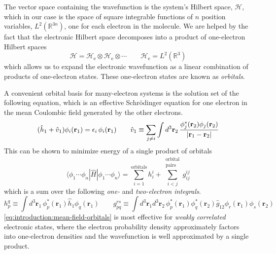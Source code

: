 The vector space containing the wavefunction is the system's Hilbert space,
\(\mathcal{H}\), which in our case is the space of square integrable functions
of \(n\) position variables,
\(
    L^2(\mathbb{R}^{3n})
\),
one for each electron in the molecule.
We are helped by the fact that the electronic Hilbert space decomposes into a
product of one-electron Hilbert spaces
\begin{equation}
    \mathcal{H}
    =
    \mathcal{H}_\mathrm{e}
    \otimes
    \mathcal{H}_\mathrm{e}
    \otimes
    \cdots
    \qquad
    \mathcal{H}_\mathrm{e}
    =
    L^2(\mathbb{R}^3)
\end{equation}
which allows us to expand the electronic wavefunction as a linear combination of
products of one-electron states.
These one-electron states are known as {\itshape orbitals}.

A convenient orbital basis for many-electron systems is the solution set of the
following equation, which is an effective Schr\"odinger equation for one
electron in the mean Coulombic field generated by the other electrons.
\begin{equation}
    \label{eq:introduction:mean-field-orbitals}
    (
        \hat{h}_1
        +
        \hat{v}_1
    )
    \phi_i(\mathbf{r}_1)
    =
    \epsilon_i\,
    \phi_i(\mathbf{r}_1)
    \qquad
    \hat{v}_1
    \equiv
    \sum_{j\neq i}
    \int
    d^3\mathbf{r}_2\,
    \frac{%
        \phi_j^*(\mathbf{r}_2)\phi_j(\mathbf{r}_2)
    }{%
        |\mathbf{r}_1 - \mathbf{r}_2|
    }
\end{equation}
This can be shown to minimize energy of a single product of orbitals
\begin{equation}
    \label{eq:introduction:orbital-product-expectation-value}
    \langle \phi_1\cdots \phi_n|
    \hat{H}
    |\phi_1\cdots \phi_n \rangle
    =
    \sum_{i=1}^\mathrm{orbitals}
    h_i^i
    +
    \sum_{i<j}^{\substack{\mathrm{orbital}\\\mathrm{pairs}}}
    g_{ij}^{ij}
\end{equation}
which is a sum over the following {\itshape one-} and {\itshape two-electron
integrals}.
\begin{equation}
    h_p^q
    \equiv
    \int
    d^3\mathbf{r}_1\,
    \phi_p^*(\mathbf{r}_1)
    \hat{h}_1
    \phi_q(\mathbf{r}_1)
    \qquad
    g_{pq}^{rs}
    \equiv
    \int
    d^3\mathbf{r}_1
    d^3\mathbf{r}_2\,
    \phi_p^*(\mathbf{r}_1)
    \phi_q^*(\mathbf{r}_2)
    \hat{g}_{12}
    \phi_r(\mathbf{r}_1)
    \phi_s(\mathbf{r}_2)
\end{equation}
\cref{eq:introduction:mean-field-orbitals} is most effective for {\itshape
weakly correlated} electronic states, where the electron probability density
approximately factors into one-electron densities and the wavefunction is well
approximated by a single product.

